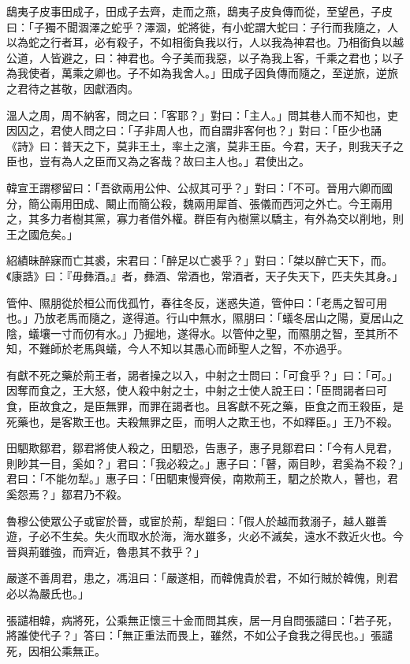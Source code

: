 \begin{pinyinscope}
鴟夷子皮事田成子，田成子去齊，走而之燕，鴟夷子皮負傳而從，至望邑，子皮曰：「子獨不聞涸澤之蛇乎？澤涸，蛇將徙，有小蛇謂大蛇曰：子行而我隨之，人以為蛇之行者耳，必有殺子，不如相銜負我以行，人以我為神君也。乃相銜負以越公道，人皆避之，曰：神君也。今子美而我惡，以子為我上客，千乘之君也；以子為我使者，萬乘之卿也。子不如為我舍人。」田成子因負傳而隨之，至逆旅，逆旅之君待之甚敬，因獻酒肉。

溫人之周，周不納客，問之曰：「客耶？」對曰：「主人。」問其巷人而不知也，吏因囚之，君使人問之曰：「子非周人也，而自謂非客何也？」對曰：「臣少也誦《詩》曰：普天之下，莫非王土，率土之濱，莫非王臣。今君，天子，則我天子之臣也，豈有為人之臣而又為之客哉？故曰主人也。」君使出之。

韓宣王謂樛留曰：「吾欲兩用公仲、公叔其可乎？」對曰：「不可。晉用六卿而國分，簡公兩用田成、闞止而簡公殺，魏兩用犀首、張儀而西河之外亡。今王兩用之，其多力者樹其黨，寡力者借外權。群臣有內樹黨以驕主，有外為交以削地，則王之國危矣。」

紹績昧醉寐而亡其裘，宋君曰：「醉足以亡裘乎？」對曰：「桀以醉亡天下，而。《康誥》曰：『毋彝酒。』者，彝酒、常酒也，常酒者，天子失天下，匹夫失其身。」

管仲、隰朋從於桓公而伐孤竹，春往冬反，迷惑失道，管仲曰：「老馬之智可用也。」乃放老馬而隨之，遂得道。行山中無水，隰朋曰：「蟻冬居山之陽，夏居山之陰，蟻壤一寸而仞有水。」乃掘地，遂得水。以管仲之聖，而隰朋之智，至其所不知，不難師於老馬與蟻，今人不知以其愚心而師聖人之智，不亦過乎。

有獻不死之藥於荊王者，謁者操之以入，中射之士問曰：「可食乎？」曰：「可。」因奪而食之，王大怒，使人殺中射之士，中射之士使人說王曰：「臣問謁者曰可食，臣故食之，是臣無罪，而罪在謁者也。且客獻不死之藥，臣食之而王殺臣，是死藥也，是客欺王也。夫殺無罪之臣，而明人之欺王也，不如釋臣。」王乃不殺。

田駟欺鄒君，鄒君將使人殺之，田駟恐，告惠子，惠子見鄒君曰：「今有人見君，則眇其一目，奚如？」君曰：「我必殺之。」惠子曰：「瞽，兩目眇，君奚為不殺？」君曰：「不能勿犁。」惠子曰：「田駟東慢齊侯，南欺荊王，駟之於欺人，瞽也，君奚怨焉？」鄒君乃不殺。

魯穆公使眾公子或宦於晉，或宦於荊，犁鉏曰：「假人於越而救溺子，越人雖善遊，子必不生矣。失火而取水於海，海水雖多，火必不滅矣，遠水不救近火也。今晉與荊雖強，而齊近，魯患其不救乎？」

嚴遂不善周君，患之，馮沮曰：「嚴遂相，而韓傀貴於君，不如行賊於韓傀，則君必以為嚴氏也。」

張譴相韓，病將死，公乘無正懷三十金而問其疾，居一月自問張譴曰：「若子死，將誰使代子？」答曰：「無正重法而畏上，雖然，不如公子食我之得民也。」張譴死，因相公乘無正。


\end{pinyinscope}
